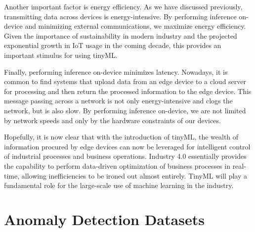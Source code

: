   Another important factor is energy efficiency. As we have discussed previously, transmitting data across devices is energy-intensive. By performing inference on-device and minimizing external communications, we maximize energy efficiency. Given the importance of sustainability in modern industry and the projected exponential growth in IoT usage in the coming decade, this provides an important stimulus for using tinyML.
  
  Finally, performing inference on-device minimizes latency. Nowadays, it is common to find systems that upload data from an edge device to a cloud server for processing and then return the processed information to the edge device. This message passing across a network is not only energy-intensive and clogs the network, but is also slow. By performing inference on-device, we are not limited by network speeds and only by the hardware constraints of our devices.
  
  Hopefully, it is now clear that with the introduction of tinyML, the wealth of information procured by edge devices can now be leveraged for intelligent control of industrial processes and business operations. Industry 4.0 essentially provides the capability to perform data-driven optimization of business processes in real-time, allowing inefficiencies to be ironed out almost entirely. TinyML will play a fundamental role for the large-scale use of machine learning in the industry.
  
  \section{Anomaly Detection Datasets}
  
